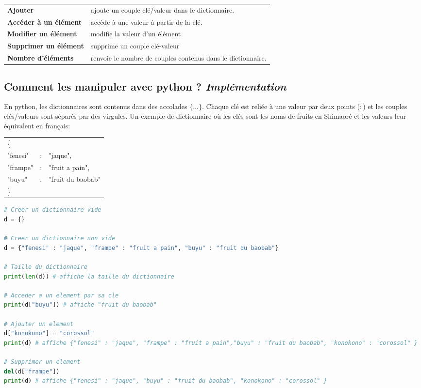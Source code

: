\noindent\begin{tabular}{l | l }
    \textbf{Ajouter} & ajoute un couple clé/valeur dans le dictionnaire.\\
    \textbf{Accéder à un élément} & accède à une valeur à partir de la clé.\\
    \textbf{Modifier un élément}  & modifie la valeur d'un élément\\
    \textbf{Supprimer un élément} & supprime un couple clé-valeur \\
    \textbf{Nombre d'éléments} & renvoie le nombre de couples contenus dans le dictionnaire. \\[0.5cm]
\end{tabular}

\subsection*{Comment les manipuler avec python ? \textit{Implémentation}}
En python, les dictionnaires sont contenus dans des accolades $\{ ... \}$.
Chaque clé est reliée à une valeur par deux points ($:$) et les couples clés/valeurs sont séparés par des virgules. Un exemple de dictionnaire où les clés sont les noms de fruits en Shimaoré et les valeurs leur équivalent en français:\\
\begin{center}
\noindent\begin{tabular}{l c l }
\{ & & \\
"fenesi" &:& "jaque",\\
"frampe" &:& "fruit a pain",\\
"buyu" &:& "fruit du baobab"\\
\} & & \\
\end{tabular}
\end{center}


\begin{lstlisting}[language=Python]
# Creer un dictionnaire vide 
d = {}

# Creer un dictionnaire non vide
d = {"fenesi" : "jaque", "frampe" : "fruit a pain", "buyu" : "fruit du baobab"}

# Taille du dictionnaire
print(len(d)) # affiche la taille du dictionnaire

# Acceder a un element par sa cle
print(d["buyu"]) # affiche "fruit du baobab"

# Ajouter un element
d["konokono"] = "corossol"
print(d) # affiche {"fenesi" : "jaque", "frampe" : "fruit a pain","buyu" : "fruit du baobab", "konokono" : "corossol" }

# Supprimer un element
del(d["frampe"])
print(d) # affiche {"fenesi" : "jaque", "buyu" : "fruit du baobab", "konokono" : "corossol" }
\end{lstlisting}

